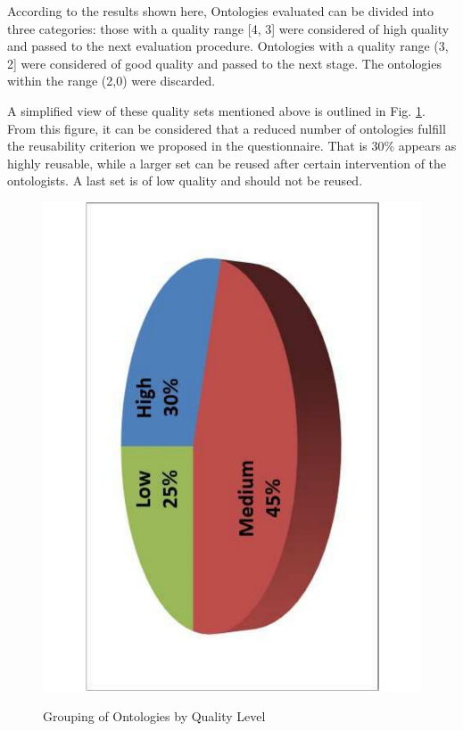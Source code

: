 According to the results shown here, Ontologies evaluated can be divided into three categories: those with a quality range [4, 3] were considered of high quality and passed to the next evaluation procedure. Ontologies with a quality range (3, 2] were considered of good quality and passed to the next stage. The ontologies within the range (2,0) were discarded.   



A simplified view of these quality sets mentioned above is outlined in Fig. \ref{figure4-2}. From this figure, it can be considered that a reduced number of ontologies fulfill the reusability criterion we proposed in the questionnaire.  That is 30\% appears as highly reusable, while a larger set can be reused   after certain intervention of the ontologists. A last set is of low quality and should not be reused. 


\begin{figure}
	\begin{center}
		\includegraphics[scale=0.4, angle=-90]{figure-chapterIV/fig4-2.pdf}\\
		\caption{Grouping of Ontologies by Quality Level}
		\label{figure4-2}
	\end{center}
\end{figure}



